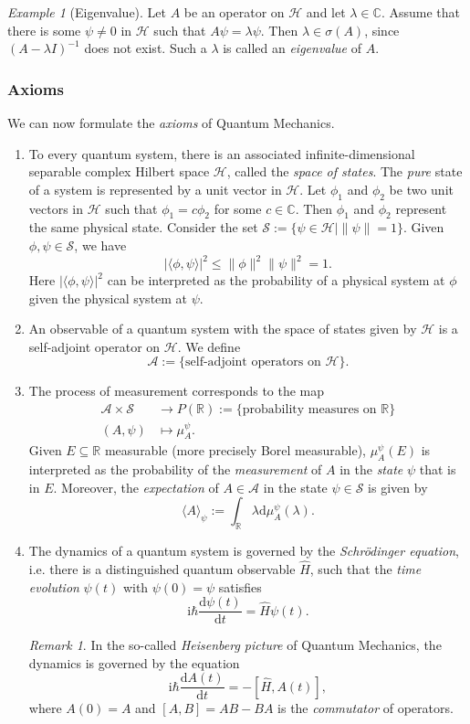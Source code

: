 \documentclass[11pt]{amsart}
\numberwithin{equation}{section}
\theoremstyle{plain}
\theoremstyle{definition}
\theoremstyle{remark}
\newtheorem{rem}{Remark}[subsection]
\newtheorem{ex}{Example}[subsection]
\newcommand{\R}{\mathbb{R}}
\newcommand{\dd}{{\mathrm{d}}}
\newcommand{\calA}{\mathcal{A}}
\newcommand{\calH}{\mathcal{H}}
\newcommand{\calS}{\mathcal{S}}
\newcommand{\I}{\mathrm{i}}
\begin{document}
\begin{ex}[Eigenvalue]
Let $A$ be an operator on $\calH$ and let $\lambda\in\mathbb{C}$. Assume that there is some $\psi\not=0$ in $\calH$ such that $A\psi=\lambda\psi$. Then $\lambda\in\sigma(A)$, since $(A-\lambda I)^{-1}$ does not exist. Such a $\lambda$ is called an \emph{eigenvalue} of $A$.
\end{ex}

\subsubsection{Axioms} We can now formulate the \emph{axioms} of Quantum Mechanics. 
\begin{enumerate}[(QM1)]
\item{To every quantum system, there is an associated infinite-dimensional separable complex Hilbert space $\calH$, called the \emph{space of states}. The \emph{pure} state of a system is represented by a unit vector in $\calH$. Let $\phi_1$ and $\phi_2$ be two unit vectors in $\calH$ such that $\phi_1=c\phi_2$ for some $c\in\mathbb{C}$. Then $\phi_1$ and $\phi_2$ represent the same physical state. Consider the set $\calS:=\{\psi\in\calH\mid\|\psi\|=1\}$. Given $\phi,\psi\in\calS$, we have $$\vert\langle\phi,\psi\rangle\vert^2\leq \|\phi\|^2\|\psi\|^2=1.$$
Here $\vert\langle\phi,\psi\rangle\vert^2$ can be interpreted as the probability of a physical system at $\phi$ given the physical system at $\psi$.
}
\item{An observable of a quantum system with the space of states given by $\calH$ is a self-adjoint operator on $\calH$. We define 
\[
\calA:=\{\text{self-adjoint operators on $\calH$}\}.
\]
}
\item{The process of measurement corresponds to the map 
\begin{align*}
\calA\times\calS&\to P(\R):=\{\text{probability measures on $\R$}\}\\
(A,\psi)&\mapsto \mu_A^\psi.
\end{align*}
Given $E\subseteq\R$ measurable (more precisely Borel measurable), $\mu_A^\psi(E)$ is interpreted as the probability of the \emph{measurement} of $A$ in the \emph{state} $\psi$ that is in $E$. Moreover, the \emph{expectation} of $A\in\calA$ in the state $\psi\in\calS$ is given by 
$$\langle A\rangle_\psi:=\int_\R\lambda \dd\mu_A^\psi(\lambda).$$
}
\item{The dynamics of a quantum system is governed by the \emph{Schr\"odinger equation}, i.e. there is a distinguished quantum observable $\widehat{H}$, such that the \emph{time evolution} $\psi(t)$ with $\psi(0)=\psi$ satisfies
$$\I\hbar\frac{\dd\psi(t)}{\dd t}=\widehat{H}\psi(t).$$
\begin{rem}
In the so-called \emph{Heisenberg picture} of Quantum Mechanics, the dynamics is governed by the equation $$\I\hbar \frac{\dd A(t)}{\dd t}=-[\widehat{H},A(t)],$$
where $A(0)=A$ and $[A,B]=AB-BA$ is the \emph{commutator} of operators.
\end{rem}
}
\end{enumerate}
\end{document}
